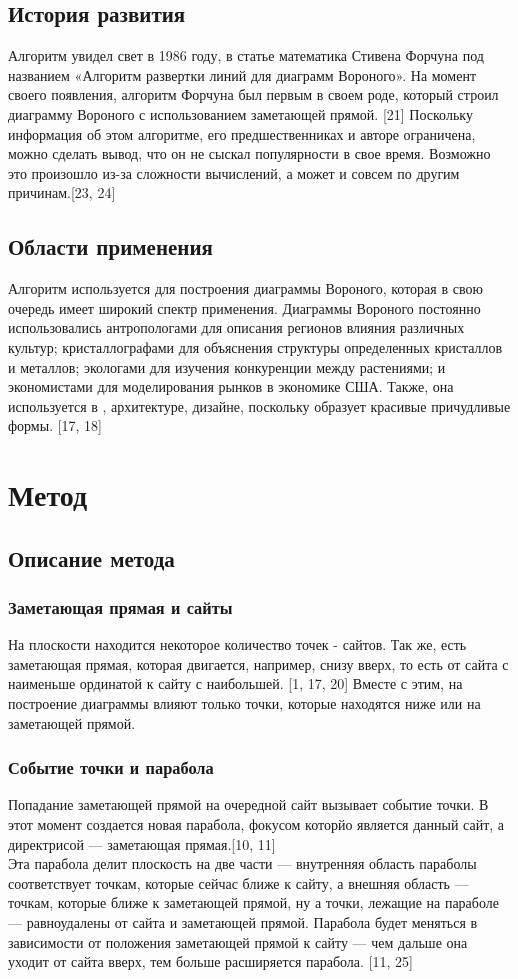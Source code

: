 \subsection{История развития}
Алгоритм увидел свет в 1986 году, в статье математика Стивена Форчуна под названием «Алгоритм развертки линий для диаграмм Вороного».  На момент своего появления, алгоритм Форчуна был первым в своем роде, который строил диаграмму Вороного с использованием заметающей прямой. [21] Поскольку информация об этом алгоритме, его предшественниках и авторе ограничена, можно сделать вывод, что он не сыскал популярности в свое время. Возможно это произошло из-за сложности вычислений, а может и совсем по другим причинам.[23, 24]

\subsection{Области применения}
Алгоритм используется для построения диаграммы Вороного, которая в свою очередь имеет широкий спектр применения. 
Диаграммы Вороного постоянно использовались антропологами для описания регионов влияния различных культур; кристаллографами для объяснения структуры определенных кристаллов и металлов; экологами для изучения конкуренции между растениями; и экономистами для моделирования рынков в экономике США. Также, она используется в , архитектуре, дизайне, поскольку образует красивые причудливые формы. [17, 18]
\newpage

\section{Метод}
\subsection{Описание метода}

\subsubsection{Заметающая прямая и сайты}
На плоскости находится некоторое количество точек - сайтов. Так же, есть заметающая прямая, которая двигается, например, снизу вверх, то есть от сайта с наименьше ординатой к сайту с наибольшей. [1, 17, 20] Вместе с этим, на построение диаграммы влияют только точки, которые находятся ниже или на заметающей прямой.

\subsubsection{Событие точки и парабола}
Попадание заметающей прямой на очередной сайт вызывает событие точки. В этот момент создается новая парабола, фокусом которйо является данный сайт, а директрисой — заметающая прямая.[10, 11] \\
 Эта парабола делит плоскость на две части — внутренняя область параболы соответствует точкам, которые сейчас ближе к сайту, а внешняя область — точкам, которые ближе к заметающей прямой, ну а точки, лежащие на параболе — равноудалены от сайта и заметающей прямой. Парабола будет меняться в зависимости от положения заметающей прямой к сайту — чем дальше она уходит от сайта вверх, тем больше расширяется парабола. [11, 25]

